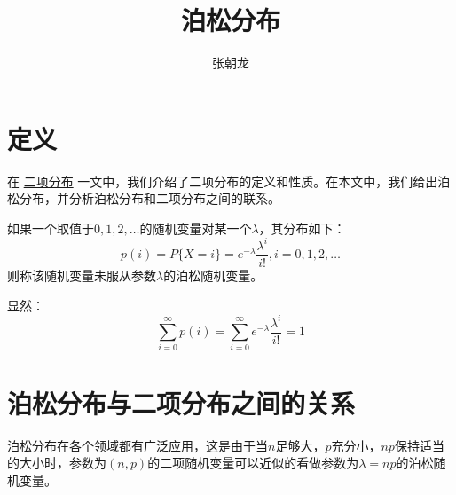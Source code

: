 \documentclass[10pt,a4paper,UTF8]{article}
\author{张朝龙}
\date{}
\title{泊松分布}
\begin{document}
\maketitle
\tableofcontents
{}

\section{定义}
\label{sec:org60bf5b3}


在 \href{binary-distribution.org}{二项分布} 一文中，我们介绍了二项分布的定义和性质。在本文中，我们给出泊松分布，并分析泊松分布和二项分布之间的联系。

\begin{definition}
如果一个取值于\(0,1,2,\ldots\)的随机变量对某一个\(\lambda\)，其分布如下：
\begin{equation}
\label{eq:1}
p(i) = P\{X=i\} = e^{-\lambda}\frac{\lambda^{i}}{i!}, i = 0,1,2,\ldots
\end{equation}
则称该随机变量未服从参数\(\lambda\)的泊松随机变量。
\end{definition}
显然：
\begin{equation}
\label{eq:2}
\sum_{i=0}^{\infty}p(i) = \sum_{i=0}^{\infty} e^{-\lambda}\frac{\lambda^{i}}{i!} = 1
\end{equation}
\section{泊松分布与二项分布之间的关系}
\label{sec:orgc3c3a14}


泊松分布在各个领域都有广泛应用，这是由于当\(n\)足够大，\(p\)充分小，\(np\)保持适当的大小时，参数为\((n,p)\)的二项随机变量可以近似的看做参数为\(\lambda = np\)的泊松随机变量。
\end{document}
